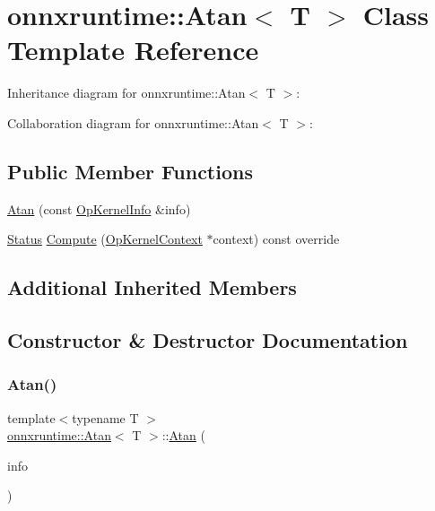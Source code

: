 \hypertarget{classonnxruntime_1_1Atan}{}\section{onnxruntime\+:\+:Atan$<$ T $>$ Class Template Reference}
\label{classonnxruntime_1_1Atan}


Inheritance diagram for onnxruntime\+:\+:Atan$<$ T $>$\+:


Collaboration diagram for onnxruntime\+:\+:Atan$<$ T $>$\+:
\subsection*{Public Member Functions}
\begin{DoxyCompactItemize}
\item 
\mbox{\hyperlink{classonnxruntime_1_1Atan_adec5f36025ede7950649076d34eef1f3}{Atan}} (const \mbox{\hyperlink{classonnxruntime_1_1OpKernelInfo}{Op\+Kernel\+Info}} \&info)
\item 
\mbox{\hyperlink{classonnxruntime_1_1common_1_1Status}{Status}} \mbox{\hyperlink{classonnxruntime_1_1Atan_a5df466303e38a353a6d6ee4699ef58e8}{Compute}} (\mbox{\hyperlink{classonnxruntime_1_1OpKernelContext}{Op\+Kernel\+Context}} $\ast$context) const override
\end{DoxyCompactItemize}
\subsection*{Additional Inherited Members}


\subsection{Constructor \& Destructor Documentation}
\mbox{\label{classonnxruntime_1_1Atan_adec5f36025ede7950649076d34eef1f3}} 
\subsubsection{\texorpdfstring{Atan()}{Atan()}}
{\footnotesize\ttfamily template$<$typename T $>$ \\
\mbox{\hyperlink{classonnxruntime_1_1Atan}{onnxruntime\+::\+Atan}}$<$ T $>$\+::\mbox{\hyperlink{classonnxruntime_1_1Atan}{Atan}} (\begin{DoxyParamCaption}\item[{const \mbox{\hyperlink{classonnxruntime_1_1OpKernelInfo}{Op\+Kernel\+Info}} \&}]{info }\end{DoxyParamCaption})\hspace{0.3cm}{\ttfamily [inline]}}



